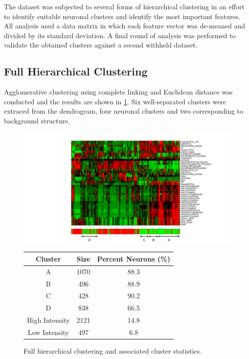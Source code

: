\documentclass[10pt]{article}
\begin{document}
The dataset was subjected to several forms of hierarchical clustering in an effort to identify suitable neuronal clusters and identify the most important features. 
All analysis used a data matrix in which each feature vector was de-meaned and divided by its standard deviation.
A final round of analysis was performed to validate the obtained clusters against a second withheld dataset.

\subsection{Full Hierarchical Clustering}

Agglomerative clustering using complete linking and Euclidean distance was conducted and the results are shown in \cref{fig:fullhierarchical}.
Six well-separated clusters were extraced from the dendrogram, four neuronal clusters and two corresponding to background structure.

\begin{figure}[h]
    \centering

    \hspace{-1cm}
    \begin{minipage}{0.6\textwidth}
      \centering
      \includegraphics[width=\textwidth]{figs/fig7_cropped.pdf}
    \end{minipage}
    \hspace{-1cm}
    \begin{minipage}{0.45\textwidth}
      \centering
      \footnotesize
      \begin{tabular}{cSS}
        \toprule
        Cluster & {Size} & {Percent Neurons (\%)} \\
        \midrule
        A & 1070 & 88.3 \\
        B &  496 & 88.9 \\
        C &  428 & 90.2 \\
        D &  838 & 66.5 \\
        High Intensity & 2121 & 14.8 \\
        Low Intensity &  497 &  6.8 \\
        \bottomrule
      \end{tabular}
    \end{minipage}
    \caption{\footnotesize Full hierarchical clustering and associated cluster statistics.}
    \label{fig:fullhierarchical}
\end{figure}
\end{document}
